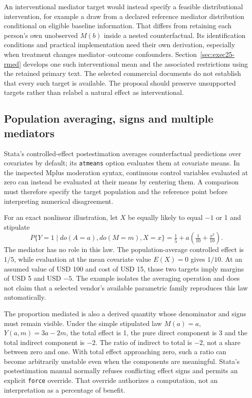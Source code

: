 An interventional mediator target would instead specify a feasible distributional intervention, for example a draw from a declared reference mediator distribution conditional on eligible baseline information. That differs from retaining each person's own unobserved $M(b)$ inside a nested counterfactual. Its identification conditions and practical implementation need their own derivation, especially when treatment changes mediator--outcome confounders. Section~\ref{sec:exec25-rmed} develops one such interventional mean and the associated restrictions using the retained primary text. The selected commercial documents do not establish that every such target is available. The proposal should preserve unsupported targets rather than relabel a natural effect as interventional.

\subsection{Population averaging, signs and multiple mediators}
\label{exec20:med-population}
Stata's controlled-effect postestimation averages counterfactual predictions over covariates by default; its \texttt{atmeans} option evaluates them at covariate means. In the inspected Mplus moderation syntax, continuous control variables evaluated at zero can instead be evaluated at their means by centering them. A comparison must therefore specify the target population and the reference point before interpreting numerical disagreement.~\citep{exec20_med_stata_post,exec20_med_mplus_ch17}

For an exact nonlinear illustration, let $X$ be equally likely to equal $-1$ or 1 and stipulate
\begin{equation}
 P\{Y=1\mid do(A=a),do(M=m),X=x\}
   =\tfrac15+a\left(\tfrac1{10}+\tfrac{x^2}{10}\right).
 \label{exec20:med-population-law}
\end{equation}
The mediator has no role in this law. The population-average controlled effect is $1/5$, while evaluation at the mean covariate value $E(X)=0$ gives $1/10$. At an assumed value of USD 100 and cost of USD 15, those two targets imply margins of USD 5 and USD $-5$. The example isolates the averaging operation and does not claim that a selected vendor's available parametric family reproduces this law automatically.~\citep{exec20_med_reference}

The proportion mediated is also a derived quantity whose denominator and signs must remain visible. Under the simple stipulated law $M(a)=a$, $Y(a,m)=3a-2m$, the total effect is 1, the pure direct component is 3 and the total indirect component is $-2$. The ratio of indirect to total is $-2$, not a share between zero and one. With total effect approaching zero, such a ratio can become arbitrarily unstable even when the components are meaningful. Stata's postestimation manual normally refuses conflicting effect signs and permits an explicit \texttt{force} override. That override authorizes a computation, not an interpretation as a percentage of benefit.~\citep{exec20_med_stata_post,exec20_med_reference}

